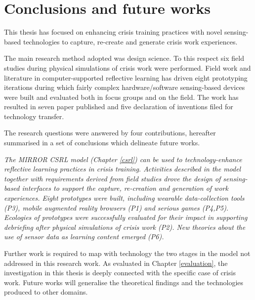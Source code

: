 \chapter{Conclusions and future works}\label{conclusions}


This thesis has focused on enhancing crisis training practices with novel sensing-based technologies to capture, re-create and generate crisis work experiences.

The main research method adopted was design science. To this respect six field studies during physical simulations of crisis work were performed. Field work and literature in computer-supported reflective learning has driven eight prototyping iterations during which fairly complex hardware/software sensing-based devices were built and evaluated both in focus groups and on the field. The work has resulted in seven paper published and five declaration of inventions filed for technology transfer.

The research questions were answered by four contributions, hereafter summarised in a set of conclusions which delineate future works. 
	
\begin{framed}
\emph{The MIRROR CSRL model (Chapter \ref{csrl}) can be used to technology-enhance reflective learning practices in crisis training. Activities described in the model together with requirements derived from field studies drove the design of sensing-based interfaces to support the capture, re-creation and generation of work experiences. Eight prototypes were built, including wearable data-collection tools (P3), mobile augmented reality browsers (P1) and serious games (P4,P5). Ecologies of prototypes were successfully evaluated for their impact in supporting debriefing after physical simulations of crisis work (P2). New theories about the use of sensor data as learning content emerged (P6).}
\par
Further work is required to map with technology the two stages in the model not addressed in this research work. As evaluated in Chapter \ref{evaluation}, the investigation in this thesis is deeply connected with the specific case of crisis work. Future works will generalise the theoretical findings and the technologies produced to other domains. 
\end{framed}

